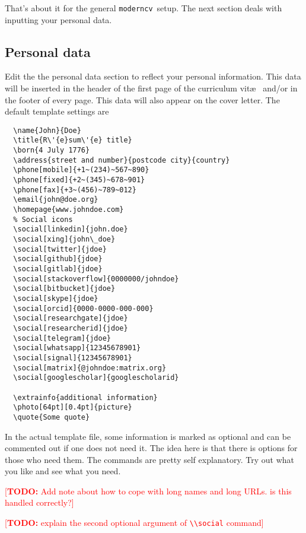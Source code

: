 \documentclass[a4paper,11pt]{article}
\newcommand{\todo}[1]{\marginpar{\textcolor{red}{[\textbf{TODO:} #1]}}}
\newcommand{\todox}[1]{\textcolor{red}{[\textbf{TODO:} #1]}}
\newcommand{\code}[1]{\lstinline!#1!}
\newcommand{\Code}[1]{\lstinline!#1!~} %
\newcommand{\Moderncv}{\Code{moderncv}}
\begin{document}
That's about it for the general \Moderncv setup. 
The next section deals with inputting your personal data.

\subsection{Personal data}
Edit the the personal data section to reflect your personal information. This data will be inserted in the header of the first page of the curriculum vit\ae~ and/or in the footer of every page. 
This data will also appear on the cover letter. 
The default template settings are

\begin{lstlisting}
  \name{John}{Doe}
  \title{R\'{e}sum\'{e} title}
  \born{4 July 1776}
  \address{street and number}{postcode city}{country}
  \phone[mobile]{+1~(234)~567~890}
  \phone[fixed]{+2~(345)~678~901}
  \phone[fax]{+3~(456)~789~012}
  \email{john@doe.org}
  \homepage{www.johndoe.com}
  % Social icons
  \social[linkedin]{john.doe}
  \social[xing]{john\_doe}               
  \social[twitter]{jdoe}                 
  \social[github]{jdoe}                  
  \social[gitlab]{jdoe}                  
  \social[stackoverflow]{0000000/johndoe}
  \social[bitbucket]{jdoe}               
  \social[skype]{jdoe}                   
  \social[orcid]{0000-0000-000-000}      
  \social[researchgate]{jdoe}            
  \social[researcherid]{jdoe}            
  \social[telegram]{jdoe}
  \social[whatsapp]{12345678901}
  \social[signal]{12345678901}
  \social[matrix]{@johndoe:matrix.org}                
  \social[googlescholar]{googlescholarid}    

  \extrainfo{additional information}     
  \photo[64pt][0.4pt]{picture}
  \quote{Some quote}                     
\end{lstlisting}
\todo{explain adding pictures}
In the actual template file, some information is marked as optional and can be commented out if one does not need it. 
The idea here is that there is options for those who need them. 
The commands are pretty self explanatory. Try out what you like and see what you need.

\todox{Add note about how to cope with long names and long URLs. is this handled correctly?}

\todox{explain the second optional argument of \code{\\social} command}
\end{document}
